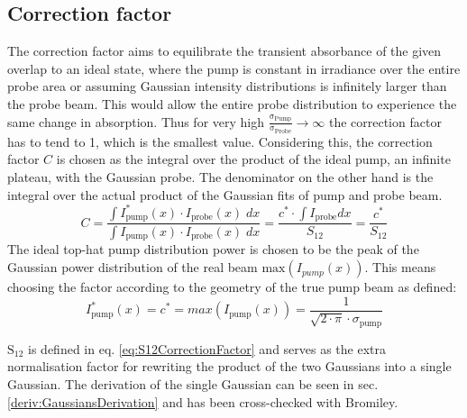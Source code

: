 \documentclass[twoside,openright,listof=numbered]{scrreprt}
\begin{document}
\subsection{Correction factor}\label{sec:CorrFactor}
The correction factor aims to equilibrate the transient absorbance of the given  overlap to an ideal state, where the pump is constant in irradiance over the entire probe area or assuming Gaussian intensity distributions is infinitely larger than the probe beam. This would allow the entire probe distribution to experience the same change in absorption.
Thus for very high $\mathrm{\frac{\sigma_{Pump}}{\sigma_{Probe}} \rightarrow \infty}$ the correction factor has to tend to 1, which is the smallest value.
Considering this, the correction factor $C$ is chosen as the integral over the product of the ideal pump, an infinite plateau, with the Gaussian probe. The denominator on the other hand is the integral over the actual product of the Gaussian fits of pump and probe beam.  
\begin{equation}\label{eq:CorrFactorGaussians} 
C = \dfrac{\int I_\text{pump}^*(x)\cdot I_\text{probe}(x) \;dx}{\int I_\text{pump}(x)\cdot I_\text{probe}(x) \; dx} = \dfrac{c^*\cdot \int I_\text{probe} dx}{S_{12}} = \dfrac{c^*}{S_{12}}
\end{equation}
The ideal top-hat pump distribution power is chosen to be the peak of the Gaussian power distribution of the real beam $\mathrm{max}\left(I_{pump}(x)\right)$. This means choosing the factor according to the geometry of the true pump beam as defined:
\begin{equation*}\label{eq:maxPowerGauss}
I_\text{pump}^*(x) = c^* = max(I_\text{pump}(x)) = \frac{1}{\sqrt{2\cdot\pi}\cdot\sigma_\text{pump}}
\end{equation*}

$\mathrm{S_{12}}$ is defined in eq. \ref{eq:S12CorrectionFactor} and serves as the extra normalisation factor for rewriting the product of the two Gaussians into a single Gaussian. The derivation of the single Gaussian can be seen in sec. \ref{deriv:GaussiansDerivation} and has been cross-checked with Bromiley.\cite{Bromiley2014}
\end{document}
